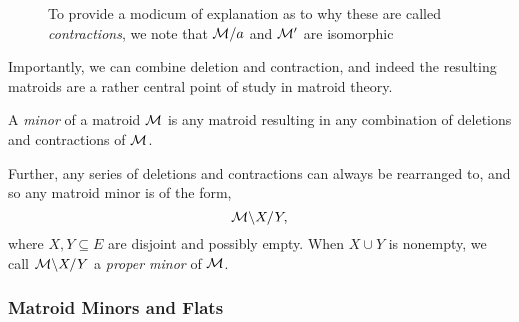 \documentclass[12pt,oneside]{../../sfsuthesis}
\begin{document}
\begin{figure}[H]
\begin{subfigure}[t]{.45\textwidth}
    \end{subfigure}
    \caption{To provide a modicum of explanation as to why these are called \emph{contractions}, we note that \( \mathcal{M}/a \) and \( \mathcal{M}' \) are isomorphic}\label{fig:contractionMatroid}

\end{figure}

Importantly, we can combine deletion and contraction, and indeed the resulting matroids are a rather central point of study in matroid theory.

\begin{definition}\th\label{def:minor}
    A \emph{minor} of a matroid \( \mathcal{M} \) is any matroid resulting in any combination of deletions and contractions of \( \mathcal{M} \).

    Further, any series of deletions and contractions can always be rearranged to, and so any matroid minor is of the form,
    \[
        \mathcal{M} \backslash X / Y,
    \]
    where \( X, Y \subseteq E \) are disjoint and possibly empty.
    When \( X \cup Y \) is nonempty, we call \( \mathcal{M} \backslash X / Y \) a \emph{proper minor} of \( \mathcal{M} \).
\end{definition}

\subsubsection{Matroid Minors and Flats}
\end{document}
